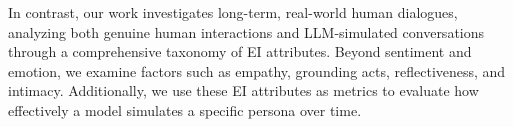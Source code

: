 In contrast, our work investigates long-term, real-world human dialogues, analyzing both genuine human interactions and LLM-simulated conversations through a comprehensive taxonomy of EI attributes. 
Beyond sentiment and emotion, we examine factors such as empathy, grounding acts, reflectiveness, and intimacy. Additionally, we use these EI attributes as metrics to evaluate how effectively a model simulates a specific persona over time.